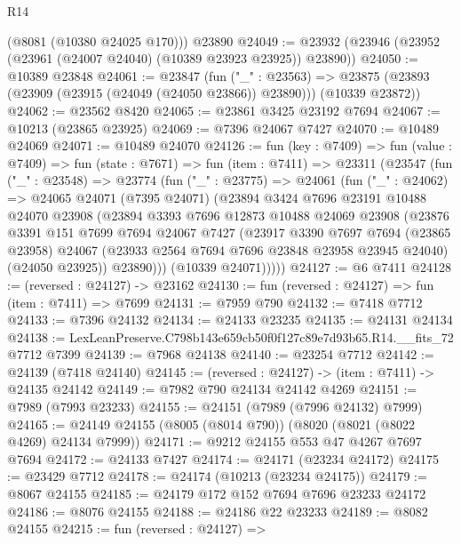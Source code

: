 \begin{lexlean}{R14}
\begin{coremodule}
      (@8081 (@10380 @24025 @170)))
    @23890
@24049 := @23932 (@23946 (@23952 (@23961 (@24007 @24040) (@10389 @23923 @23925)) @23890))
@24050 := @10389 @23848
@24061 := @23847
    (fun ("_" : @23563) =>
    @23875 (@23893 (@23909 (@23915 (@24049 (@24050 @23866)) @23890))) (@10339 @23872))
@24062 := @23562 @8420
@24065 := @23861 @3425 @23192 @7694
@24067 := @10213 (@23865 @23925)
@24069 := @7396 @24067 @7427
@24070 := @10489 @24069
@24071 := @10489 @24070
@24126 := fun (key : @7409) =>
  fun (value : @7409) =>
  fun (state : @7671) =>
  fun (item : @7411) =>
  @23311
    (@23547
      (fun ("_" : @23548) =>
      @23774
        (fun ("_" : @23775) =>
        @24061
          (fun ("_" : @24062) =>
          @24065
            @24071
            (@7395 @24071)
            (@23894
              @3424
              @7696
              @23191
              @10488
              @24070
              @23908
              (@23894
                @3393
                @7696
                @12873
                @10488
                @24069
                @23908
                (@23876
                  @3391
                  @151
                  @7699
                  @7694
                  @24067
                  @7427
                  (@23917
                    @3390
                    @7697
                    @7694
                    (@23865 @23958)
                    @24067
                    (@23933 @2564 @7694 @7696 @23848 @23958 @23945 @24040)
                    (@24050 @23925))
                  @23890)))
            (@10339 @24071)))))
@24127 := @6 @7411
@24128 := (reversed : @24127) -> @23162
@24130 := fun (reversed : @24127) => fun (item : @7411) => @7699
@24131 := @7959 @790
@24132 := @7418 @7712
@24133 := @7396 @24132
@24134 := @24133 @23235
@24135 := @24131 @24134
@24138 := LexLeanPreserve.C798b143e659cb50f0f127c89e7d93b65.R14.__fits_72 @7712 @7399
@24139 := @7968 @24138
@24140 := @23254 @7712
@24142 := @24139 (@7418 @24140)
@24145 := (reversed : @24127) -> (item : @7411) -> @24135 @24142
@24149 := @7982 @790 @24134 @24142 @4269
@24151 := @7989 (@7993 @23233)
@24155 := @24151 (@7989 (@7996 @24132) @7999)
@24165 := @24149 @24155 (@8005 (@8014 @790)) (@8020 (@8021 (@8022 @4269) @24134 @7999))
@24171 := @9212 @24155 @553 @47 @4267 @7697 @7694
@24172 := @24133 @7427
@24174 := @24171 (@23234 @24172)
@24175 := @23429 @7712
@24178 := @24174 (@10213 (@23234 @24175))
@24179 := @8067 @24155
@24185 := @24179 @172 @152 @7694 @7696 @23233 @24172
@24186 := @8076 @24155
@24188 := @24186 @22 @23233
@24189 := @8082 @24155
@24215 := fun (reversed : @24127) =>

\end{coremodule}
\end{lexlean}
